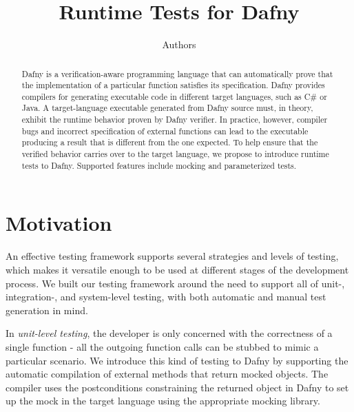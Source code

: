 \documentclass[runningheads]{llncs}
\begin{document}
 

\title{Runtime Tests for Dafny}
\author{Authors}

\maketitle  
\begin{abstract}
Dafny is a verification-aware programming language that can automatically prove that the implementation of a particular function satisfies its specification. 
Dafny provides compilers for generating executable code in different target languages, such as C\# or Java. 
A target-language executable generated from Dafny source must, in theory, exhibit the runtime behavior proven by Dafny verifier. 
In practice, however, compiler bugs and incorrect specification of external functions can lead to the executable producing a result that is different from the one expected. 
To help ensure that the verified behavior carries over to the target language, we propose to introduce runtime tests to Dafny. 
Supported features include mocking and parameterized tests.
\end{abstract}

\setcounter{footnote}{0} 



\section{Motivation}
\label{sec:motivation}

An effective testing framework supports several strategies and levels of testing, which makes it versatile enough to be used at different stages of the development process. 
We built our testing framework around the need to support all of unit\nobreakdash-, integration\nobreakdash-, and system\nobreakdash-level testing, with both automatic and manual test generation in mind.

In \textit{unit-level testing}, the developer is only concerned with the correctness of a single function - all the outgoing function calls can be stubbed to mimic a particular scenario. 
We introduce this kind of testing to Dafny by supporting the automatic compilation of external methods that return mocked objects. 
The compiler uses the postconditions constraining the returned object in Dafny to set up the mock in the target language using the appropriate mocking library.
\end{document}
